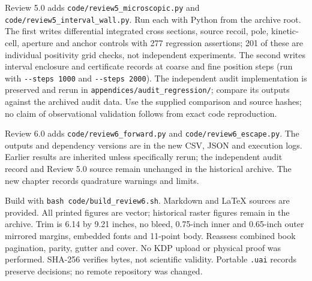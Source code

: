 \documentclass[
  11pt,
  twoside]{article}
\begin{document}
Review 5.0 adds \nolinkurl{code/review5_microscopic.py} and
\nolinkurl{code/review5_interval_wall.py}. Run each with Python from the
archive root. The first writes differential integrated cross sections,
source recoil, pole, kinetic-cell, aperture and anchor controls with 277
regression assertions; 201 of these are individual positivity grid
checks, not independent experiments. The second writes interval
enclosure and certificate records at coarse and fine position steps (run
with \texttt{-\/-steps\ 1000} and \texttt{-\/-steps\ 2000}). The
independent audit implementation is preserved and rerun in
\nolinkurl{appendices/audit_regression/}; compare its outputs against
the archived audit data. Use the supplied comparison and source hashes;
no claim of observational validation follows from exact code
reproduction.

Review 6.0 adds \nolinkurl{code/review6_forward.py} and
\nolinkurl{code/review6_escape.py}. The outputs and dependency versions
are in the new CSV, JSON and execution logs. Earlier results are
inherited unless specifically rerun; the independent audit record and
Review 5.0 source remain unchanged in the historical archive. The new
chapter records quadrature warnings and limits.

\par

Build with \nolinkurl{bash code/build_review6.sh}. Markdown and LaTeX
sources are provided. All printed figures are vector; historical raster
figures remain in the archive. Trim is 6.14 by 9.21 inches, no bleed,
0.75-inch inner and 0.65-inch outer mirrored margins, embedded fonts and
11-point body. Reassess combined book pagination, parity, gutter and
cover. No KDP upload or physical proof was performed. SHA-256 verifies
bytes, not scientific validity. Portable \texttt{.uai} records preserve
decisions; no remote repository was changed.
\end{document}
